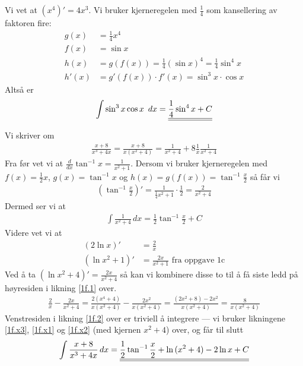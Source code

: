 \documentclass[a4paper,norsk,12pt]{article}
\begin{document}
Vi vet at $(x^4)' = 4x^3$. Vi bruker kjerneregelen med $\frac{1}{4}$ som
kansellering av faktoren fire:
\begin{align*}
  g(x) &= \frac{1}{4} x^4 \\
  f(x) &= \sin{x} \\
  h(x) &= g(f(x)) = \frac{1}{4}(\sin{x})^4 = \frac{1}{4} \sin^4{x} \\
  h'(x) &= g'(f(x)) \cdot f'(x) = \sin^3{x} \cdot \cos{x}
\end{align*}
Altså er
\begin{align*}
  \int \sin^3{x} \cos{x} \,dx = \svar{ \frac{1}{4} \sin^4{x} + C }
\end{align*}

Vi skriver om
\begin{align}
  \label{1f.1}
  \frac{x+8}{x^3+4x} = \frac{x+8}{x(x^2+4)} =
    \frac{1}{x^2+4} + 8\frac{1}{x}\frac{1}{x^2+4}
\end{align}
Fra før vet vi at $\frac{d}{dx}\tan^{-1}{x} = \frac{1}{x^2+1}$. Dersom vi
bruker kjerneregelen med $f(x) = \frac{1}{2}x$, $g(x) = \tan^{-1}{x}$ og $h(x) =
g(f(x)) = \tan^{-1}{\frac{x}{2}}$ så får vi
\begin{align*}
  \left( \tan^{-1}{\frac{x}{2}} \right)' =
    \frac{1}{\frac{1}{4}x^2+1}\cdot\frac{1}{2} = \frac{2}{x^2+4}
\end{align*}
Dermed ser vi at
\begin{align}
  \label{1f.x3}
  \int\frac{1}{x^2+4}\,dx = \frac{1}{2}\tan^{-1}{\frac{x}{2}} + C
\end{align}
%
Videre vet vi at
\begin{align}
  \label{1f.x1}
  (2\ln{x})' &= \frac{2}{x} \\
  \label{1f.x2}
  (\ln{x^2+1})' &= \frac{2x}{x^2+1} \text{~fra oppgave 1c}
\end{align}
Ved å ta $(\ln{x^2+4})' = \frac{2x}{x^2+4}$
så kan vi kombinere disse to til å få siste ledd på høyresiden i likning
\vref{1f.1} over.
\begin{align}
  \label{1f.2}
  \frac{2}{x} - \frac{2x}{x^2+4} = \frac{2(x^4+4)}{x(x^2+4)}
    - \frac{2x^2}{x(x^2+4)} 
    = \frac{(2x^2+8) - 2x^2}{x(x^2+4)} = \frac{8}{x(x^2+4)}
\end{align}
Venstresiden i likning \vref{1f.2} over er triviell å integrere --- vi bruker
likningene \vref{1f.x3}, \vref{1f.x1} og \vref{1f.x2} (med kjernen $x^2+4$)
over, og får til slutt
\begin{align*}
  \int \frac{x+8}{x^3+4x} \,dx = {\underline{\underline{\frac{1}{2}\tan^{-1}{\frac{x}{2}} +
  \ln{(x^2+4)} - 2\ln{x} + C}}}
\end{align*}
\end{document}
